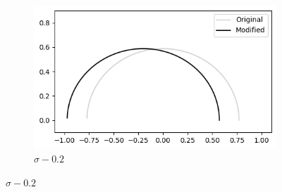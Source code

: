 \documentclass[a4paper]{report}
\begin{document}
\begin{figure}[ht]
    \begin{subfigure}{.3\linewidth}
      \includegraphics[width=\linewidth]{images/deformations/negative_sigma.png}
      \caption{$\sigma - 0.2$}
        \label{fig:negative_sigma}
    \end{subfigure}

    \medskip


\end{figure}
\end{document}
